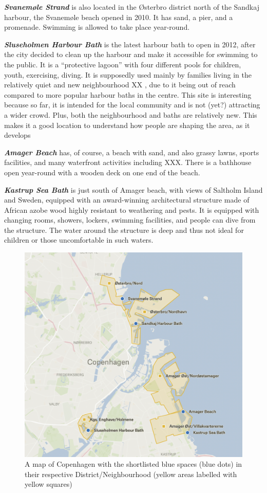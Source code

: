 \documentclass{article}
\newcommand{\bisection}[1]{\textbf{\textit{#1}}}
\begin{document}
\bisection{Svanemøle Strand} is also located in the Østerbro district north of the Sandkaj harbour, the Svanemøle beach opened in 2010. It has sand, a pier, and a promenade. Swimming is allowed to take place year-round.

\bisection{Sluseholmen Harbour Bath} is the latest harbour bath to open in 2012, after the city decided to clean up the harbour and make it accessible for swimming to the public. It is a “protective lagoon” \parencite{visitcopenhagenSluseholmen} with four different pools for children, youth, exercising, diving. It is supposedly used mainly by families living in the relatively quiet and new neighbourhood XX \parencite{bak_2015}, due to it being out of reach compared to more popular harbour baths in the centre. This site is interesting because so far, it is intended for the local community and is not (yet?) attracting a wider crowd. Plus, both the neighbourhood and baths are relatively new. This makes it a good location to understand how people are shaping the area, as it develops

\bisection{Amager Beach} has, of course, a beach with sand, and also grassy lawns, sports facilities, and many waterfront activities including XXX. There is a bathhouse open year-round with a wooden deck on one end of the beach.

\bisection{Kastrup Sea Bath} is just south of Amager beach, with views of Saltholm Island and Sweden, equipped with an award-winning architectural structure made of African azobe wood highly resistant to weathering and pests. It is equipped with changing rooms, showers, lockers, swimming facilities, and people can dive from the structure. The water around the structure is deep and thus not ideal for children or those uncomfortable in such waters.

\begin{figure}[htp]
	\includegraphics[width=\textwidth]{copenhagen_blue_spaces.png}
	\caption{A map of Copenhagen with the shortlisted blue spaces (blue dots) in their respective District/Neighbourhood (yellow areas labelled with yellow squares)}
\end{figure}
\end{document}
